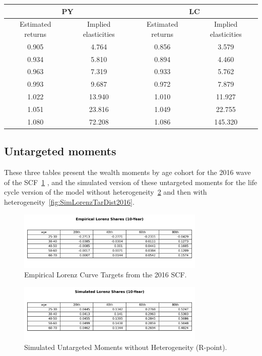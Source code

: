 \begin{center}
\begin{tabular}{|c|c|c|c|}
\hline
\multicolumn{2}{|c|}{PY} & \multicolumn{2}{|c|}{LC} \\
\hline
Estimated returns & Implied elasticities & Estimated returns & Implied elasticities \\
\hline
0.905 & 4.764 & 0.856 & 3.579 \\
0.934 & 5.810 & 0.894 & 4.460 \\
0.963 & 7.319 & 0.933 & 5.762 \\
0.993 & 9.687 & 0.972 & 7.879 \\
1.022 & 13.940 & 1.010 & 11.927 \\
1.051 & 23.816 & 1.049 & 22.755 \\
1.080 & 72.208 & 1.086 & 145.320 \\
\hline
\end{tabular}
\end{center}

\subsection{Untargeted moments}

\par These three tables present the wealth moments by age cohort for the 2016 wave of the SCF~\ref{fig:EmpLorenzTar2016} , and the simulated version of these untargeted moments for the life cycle version of the model without heterogeneity~\ref{fig:SimLorenzTarPoint2016} and then with heterogeneity~\ref{fig:SimLorenzTarDist2016}.

\begin{figure}[h]
\centering
\includegraphics[width=0.8\textwidth]{Tables/Emp_Lorenz_10yr_LCrrDistNetWorth_2016.png}
\caption{Empirical Lorenz Curve Targets from the 2016 SCF.}
\label{fig:EmpLorenzTar2016}
\end{figure}

\begin{figure}[htbp]
\centering
\includegraphics[width=0.8\textwidth]{Tables/Sim_Lorenz_10yr_LCrrPointNetWorth_2016.png}
\caption{Simulated Untargeted Moments without Heterogeneity (R-point).}
\label{fig:SimLorenzTarPoint2016}
\end{figure}


